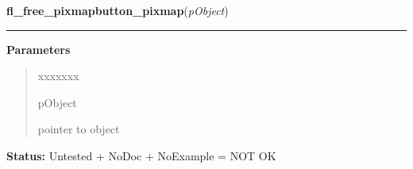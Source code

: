     \label{xformslib:library:fl_free_pixmap_pixmap}

    \vspace{0.5ex}

\hspace{.8\funcindent}\begin{boxedminipage}{\funcwidth}

    \raggedright \textbf{fl\_free\_pixmapbutton\_pixmap}(\textit{pObject})

    \vspace{-1.5ex}

    \rule{\textwidth}{0.5\fboxrule}
\setlength{\parskip}{2ex}
\setlength{\parskip}{1ex}
      \textbf{Parameters}
      \vspace{-1ex}

      \begin{quote}
        \begin{Ventry}{xxxxxxx}

          \item[pObject]

          pointer to object

        \end{Ventry}

      \end{quote}

\textbf{Status:} Untested + NoDoc + NoExample = NOT OK



    \end{boxedminipage}

    \label{xformslib:library:fl_set_pixmap_file}

    \vspace{0.5ex}

